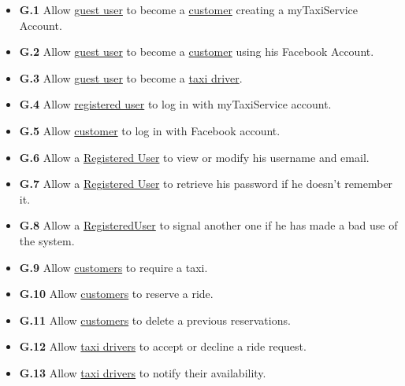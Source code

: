 		\begin{itemize}
			\item \textbf{\lbrack G.1\rbrack}\label{sec:g1} Allow \hyperref[sec:normaluser]{guest user} to become a \hyperref[sec:customer]{customer} creating a myTaxiService Account.

			\item \textbf{\lbrack G.2\rbrack}\label{sec:g2} Allow \hyperref[sec:normaluser]{guest user} to become a \hyperref[sec:customer]{customer} using his Facebook Account.

			\item \textbf{\lbrack G.3\rbrack}\label{sec:g3} Allow \hyperref[sec:normaluser]{guest user} to become a \hyperref[sec:tdriver]{taxi driver}.

			\item \textbf{\lbrack G.4\rbrack}\label{sec:g4} Allow \hyperref[sec:ruser]{registered user} to log in with myTaxiService account.

			\item \textbf{\lbrack G.5\rbrack}\label{sec:g5} Allow \hyperref[sec:customer]{customer} to log in with Facebook account.

			\item \textbf{\lbrack G.6\rbrack}\label{sec:g5} Allow a \hyperref[sec:normaluser]{Registered User} to view or modify his username and email.

			\item \textbf{\lbrack G.7\rbrack}\label{sec:g7} Allow a \hyperref[sec:normaluser]{Registered User} to retrieve his password if he doesn't remember it.

			\item \textbf{\lbrack G.8\rbrack}\label{sec:g8} Allow a \hyperref[sec:normaluser]{RegisteredUser} to signal another one if he has made a bad use of the system.

			\item \textbf{\lbrack G.9\rbrack}\label{sec:g9} Allow \hyperref[sec:customer]{customers} to require a taxi.

			\item \textbf{\lbrack G.10\rbrack}\label{sec:g10} Allow \hyperref[sec:customer]{customers} to reserve a ride.

			\item \textbf{\lbrack G.11\rbrack}\label{sec:g11} Allow \hyperref[sec:customer]{customers} to delete a previous reservations.

			\item \textbf{\lbrack G.12\rbrack}\label{sec:g12} Allow \hyperref[sec:tdriver]{taxi drivers} to accept or decline a ride request.

			\item \textbf{\lbrack G.13\rbrack}\label{sec:g13} Allow \hyperref[sec:tdriver]{taxi drivers} to notify their availability.
		\end{itemize}
		
